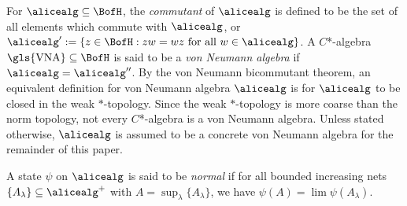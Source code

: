 For $\alicealg \subseteq \BofH$, the \textit{commutant}  of $\alicealg$ is defined to be the set of all elements which commute with $\alicealg$, or $\alicealg' := \{z \in \BofH : zw = wz \text{ for all } w \in \alicealg\}$. A $C$*-algebra $\text{\gls{VNA}} \subseteq \BofH$ is said to be a \textit{von Neumann algebra} if $\alicealg = \alicealg''$. By the von Neumann bicommutant theorem, an equivalent definition for von Neumann algebra  $\alicealg$ is for $\alicealg$ to be closed in the weak $*$-topology. Since the weak $*$-topology is more coarse than the norm topology, not every $C$*-algebra is a von Neumann algebra. Unless stated otherwise, $\alicealg$ is assumed to be a concrete von Neumann algebra for the remainder of this paper. 

A state $\psi$ on $\alicealg$ is said to be \textit{normal} if for all bounded increasing nets $\{A_{\lambda}\} \subseteq \alicealg^{+}$ with $A = \sup_{\lambda} \{ A_{\lambda} \}$, we have $\psi(A) = \lim \psi(A_{\lambda})$. 


